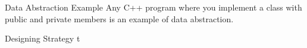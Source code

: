 \documentclass[../lecture5-objectorientation.tex]{subfiles}
\begin{document}

\begin{frame}[fragile]{Data Abstraction Example}
    Any C++ program where you implement a class with public and private members is an example of data abstraction.
\end{frame}


\begin{frame}[fragile]{Designing Strategy}
t
\end{frame}

\end{document}
